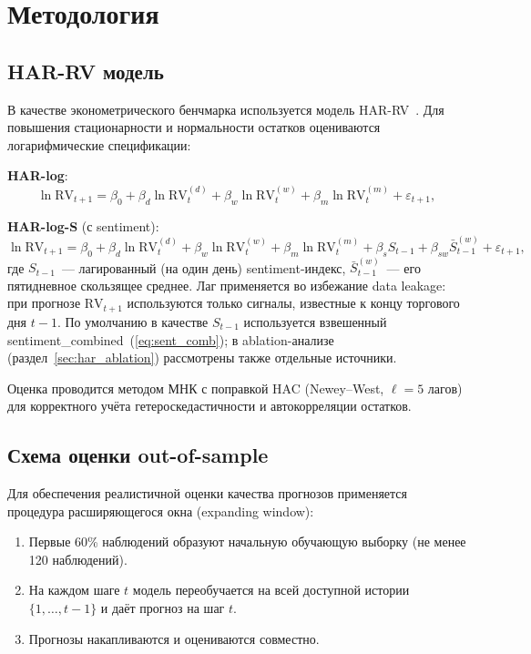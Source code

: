 \section{Методология}

\subsection{HAR-RV модель}

В качестве эконометрического бенчмарка используется модель HAR-RV~\cite{Corsi2009}.
Для повышения стационарности и нормальности остатков оцениваются
логарифмические спецификации:

\textbf{HAR-log}:
\begin{equation}\label{eq:har-log}
    \ln \mathrm{RV}_{t+1} = \beta_0
    + \beta_d \ln \mathrm{RV}_t^{(d)}
    + \beta_w \ln \mathrm{RV}_t^{(w)}
    + \beta_m \ln \mathrm{RV}_t^{(m)}
    + \varepsilon_{t+1},
\end{equation}

\textbf{HAR-log-S} (с sentiment):
\begin{equation}\label{eq:har-s}
    \ln \mathrm{RV}_{t+1} = \beta_0
    + \beta_d \ln \mathrm{RV}_t^{(d)}
    + \beta_w \ln \mathrm{RV}_t^{(w)}
    + \beta_m \ln \mathrm{RV}_t^{(m)}
    + \beta_s S_{t-1}
    + \beta_{sw} \bar{S}_{t-1}^{(w)}
    + \varepsilon_{t+1},
\end{equation}
где $S_{t-1}$~--- лагированный (на один день) sentiment-индекс,
$\bar{S}_{t-1}^{(w)}$~--- его пятидневное скользящее среднее.
Лаг применяется во избежание data leakage: при прогнозе $\mathrm{RV}_{t+1}$
используются только сигналы, известные к концу торгового дня $t-1$.
По умолчанию в качестве $S_{t-1}$ используется взвешенный
sentiment\_combined~(\ref{eq:sent_comb}); в ablation-анализе
(раздел~\ref{sec:har_ablation}) рассмотрены также отдельные источники.

Оценка проводится методом МНК с поправкой HAC (Newey--West, $\ell = 5$ лагов)
для корректного учёта гетероскедастичности и автокорреляции остатков.

\subsection{Схема оценки out-of-sample}

Для обеспечения реалистичной оценки качества прогнозов применяется
процедура расширяющегося окна (expanding window):

\begin{enumerate}
    \item Первые 60\% наблюдений образуют начальную обучающую выборку
          (не менее 120 наблюдений).
    \item На каждом шаге $t$ модель переобучается на всей доступной истории
          $\{1, \ldots, t-1\}$ и даёт прогноз на шаг $t$.
    \item Прогнозы накапливаются и оцениваются совместно.
\end{enumerate}

